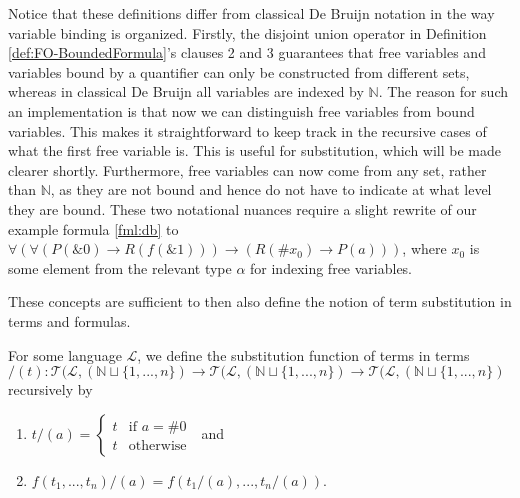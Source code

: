 Notice that these definitions differ from classical De Bruijn \cite{bruijn:1972} notation in the way variable binding is organized. Firstly, the disjoint union operator in Definition \ref{def:FO-BoundedFormula}'s clauses 2 and 3 guarantees that free variables and variables bound by a quantifier can only be constructed from different sets, whereas in classical De Bruijn all variables are indexed by $\mathbb{N}$. The reason for such an implementation is that now we can distinguish free variables from bound variables. This makes it straightforward to keep track in the recursive cases of what the first free variable is. This is useful for substitution, which will be made clearer shortly. Furthermore, free variables can now come from any set, rather than $\mathbb{N}$, as they are not bound and hence do not have to indicate at what level they are bound. These two notational nuances require a slight rewrite of our example formula \ref{fml:db} to $\forall (\forall(P(\&0) \rightarrow R(f(\&1))) \to (R(\#x_0) \to P(a)))$, where $x_0$ is some element from the relevant type $\alpha$ for indexing free variables.

These concepts are sufficient to then also define the notion of term substitution in terms and formulas. 
\begin{definition}\label{def:Term-Substitution}
\leanok
{}
For some language $\mathcal{L}$, we define the substitution function of terms in terms $/(t) : \mathcal{T}(\mathcal{L},(\mathbb{N} \sqcup \{1,...,n\}) \to \mathcal{T}(\mathcal{L},(\mathbb{N} \sqcup \{1,...,n\}) \to \mathcal{T}(\mathcal{L},(\mathbb{N} \sqcup \{1,...,n\})$ recursively by
\begin{enumerate}
\item $t/(a) = \begin{cases}
    t & \text{if } a = \#0 \\
    t & \text{otherwise }
\end{cases}$ and
\item $f(t_1,...,t_n)/(a) = f(t_1/(a),...,t_n/(a))$.
\end{enumerate}
\end{definition}

